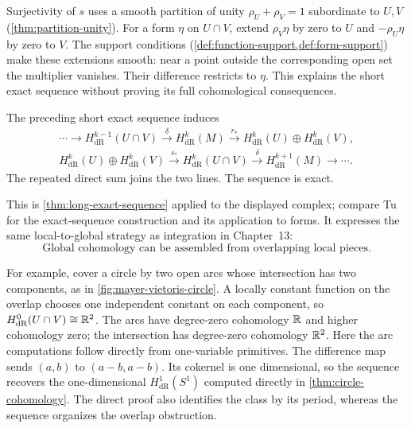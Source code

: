 Surjectivity of $s$ uses a smooth partition of unity
$\rho_U+\rho_V=1$ subordinate to $U,V$
(\cref{thm:partition-unity}). For a form $\eta$ on $U\cap V$,
extend $\rho_V\eta$ by zero to $U$ and $-\rho_U\eta$ by zero to $V$.
The support conditions (\cref{def:function-support,def:form-support})
make these extensions smooth: near a point outside the corresponding
open set the multiplier vanishes. Their difference restricts to $\eta$.
This explains the short exact sequence without proving its full
cohomological consequences.

\begin{theorem}
\label{thm:de-rham-mayer-vietoris}
The preceding short exact sequence induces
\[
\begin{gathered}
\cdots\to H_{\mathrm{dR}}^{k-1}(U\cap V)\xrightarrow{\delta}
H_{\mathrm{dR}}^k(M)\xrightarrow{r_*}
H_{\mathrm{dR}}^k(U)\oplus H_{\mathrm{dR}}^k(V),\\
H_{\mathrm{dR}}^k(U)\oplus H_{\mathrm{dR}}^k(V)
\xrightarrow{s_*}H_{\mathrm{dR}}^k(U\cap V)
\xrightarrow{\delta}H_{\mathrm{dR}}^{k+1}(M)\to\cdots.
\end{gathered}
\]
The repeated direct sum joins the two lines. The sequence is exact.
\end{theorem}
This is \cref{thm:long-exact-sequence} applied to the displayed complex;
compare Tu~\cite[\S\S25--26]{tu-manifolds} for the exact-sequence
construction and its application to forms.
It expresses the same local-to-global strategy as integration in Chapter~13:
\[
\boxed{\text{Global cohomology can be assembled from overlapping local pieces.}}
\]
\par

\FloatBarrier

For example, cover a circle by two open arcs whose intersection has two
components, as in \cref{fig:mayer-vietoris-circle}. A locally constant
function on the overlap chooses one independent constant on each component,
so $H^0_{\mathrm{dR}}(U\cap V)\cong\mathbb{R}^2$. The arcs have degree-zero cohomology $\mathbb{R}$ and higher
cohomology zero; the intersection has degree-zero cohomology $\mathbb{R}^2$.
Here the arc computations follow directly from one-variable primitives.
The difference map sends $(a,b)$ to $(a-b,a-b)$. Its cokernel is one
dimensional, so the sequence recovers the one-dimensional
$H_{\mathrm{dR}}^1(S^1)$ computed directly in
\cref{thm:circle-cohomology}. The direct proof also identifies the
class by its period, whereas the sequence organizes the overlap obstruction.


